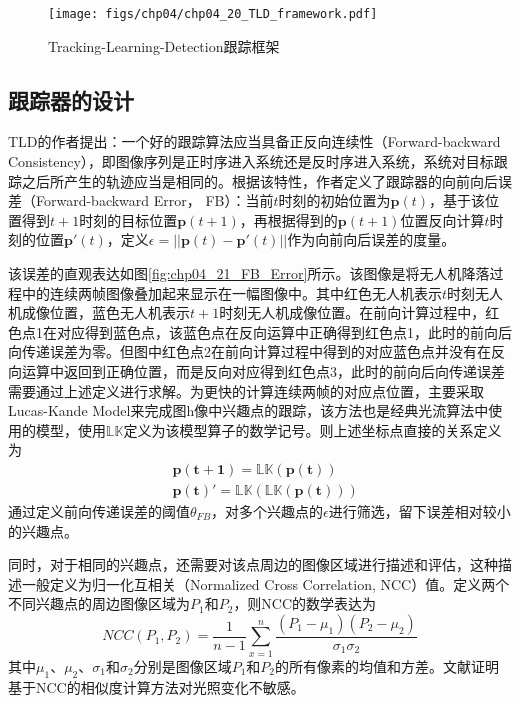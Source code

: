 \begin{figure}[ht]   
	\centering
	\texttt{[image: figs/chp04/chp04\_20\_TLD\_framework.pdf]}
	\caption{Tracking-Learning-Detection跟踪框架}
	\label{fig:chp04_20_TLD_framework}
\end{figure}


\subsection{跟踪器的设计}
TLD的作者提出：一个好的跟踪算法应当具备正反向连续性（Forward-backward Consistency）\cite{kalal2010forward}，即图像序列是正时序进入系统还是反时序进入系统，系统对目标跟踪之后所产生的轨迹应当是相同的。根据该特性，作者定义了跟踪器的向前向后误差（Forward-backward Error， FB）：当前$t$时刻的初始位置为$\mathbf{p}(t)$，基于该位置得到$t+1$时刻的目标位置$\mathbf{p}(t+1)$，再根据得到的$\mathbf{p}(t+1)$位置反向计算$t$时刻的位置$ \mathbf{p}'(t)$，定义$\epsilon =||\mathbf{p}(t)-\mathbf{p}'(t)||$作为向前向后误差的度量。

该误差的直观表达如图\ref{fig:chp04_21_FB_Error}所示。该图像是将无人机降落过程中的连续两帧图像叠加起来显示在一幅图像中。其中红色无人机表示$t$时刻无人机成像位置，蓝色无人机表示$t+1$时刻无人机成像位置。在前向计算过程中，红色点1在对应得到蓝色点，该蓝色点在反向运算中正确得到红色点1，此时的前向后向传递误差为零。但图中红色点2在前向计算过程中得到的对应蓝色点并没有在反向运算中返回到正确位置，而是反向对应得到红色点3，此时的前向后向传递误差需要通过上述定义进行求解。为更快的计算连续两帧的对应点位置，主要采取Lucas-Kande Model\cite{lucas1981iterative}来完成图h像中兴趣点的跟踪，该方法也是经典光流算法中使用的模型，使用$\mathbb{LK}$定义为该模型算子的数学记号。则上述坐标点直接的关系定义为
\begin{align}
&\mathbf{p(t+1)} = \mathbb{LK}(\mathbf{p(t)}) \\
&\mathbf{p(t)}' = \mathbb{LK}(\mathbb{LK}(\mathbf{p(t)}))
\end{align}
通过定义前向传递误差的阈值$\theta_{FB}$，对多个兴趣点的$\epsilon$进行筛选，留下误差相对较小的兴趣点。

同时，对于相同的兴趣点，还需要对该点周边的图像区域进行描述和评估，这种描述一般定义为归一化互相关（Normalized Cross Correlation, NCC）值。定义两个不同兴趣点的周边图像区域为$P_1$和$P_2$，则NCC的数学表达为
\begin{equation}
NCC(P_1, P_2) = \frac{1}{n-1}\sum_{x=1}^{n}\frac{(P_1-\mu_1)(P_2-\mu_2)}{\sigma_1\sigma_2}
\end{equation}
其中$\mu_1$、$\mu_2$、$\sigma_1$和$\sigma_2$分别是图像区域$P_1$和$P_2$的所有像素的均值和方差。文献\cite{lewis1995fast}证明基于NCC的相似度计算方法对光照变化不敏感。


